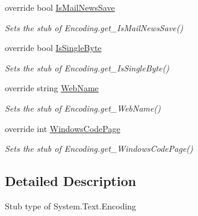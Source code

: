 \begin{DoxyCompactItemize}
override bool \hyperlink{class_system_1_1_text_1_1_fakes_1_1_stub_encoding_accb4e359b9ed466bb199413dc0393934}{Is\-Mail\-News\-Save}
\begin{DoxyCompactList}\small\item\em Sets the stub of Encoding.\-get\-\_\-\-Is\-Mail\-News\-Save()\end{DoxyCompactList}\item 
override bool \hyperlink{class_system_1_1_text_1_1_fakes_1_1_stub_encoding_adee6cc70909c3c18fd26ea3bbe9387b1}{Is\-Single\-Byte}
\begin{DoxyCompactList}\small\item\em Sets the stub of Encoding.\-get\-\_\-\-Is\-Single\-Byte()\end{DoxyCompactList}\item 
override string \hyperlink{class_system_1_1_text_1_1_fakes_1_1_stub_encoding_af3773749cb2996fdf4b648b1b5650fb5}{Web\-Name}
\begin{DoxyCompactList}\small\item\em Sets the stub of Encoding.\-get\-\_\-\-Web\-Name()\end{DoxyCompactList}\item 
override int \hyperlink{class_system_1_1_text_1_1_fakes_1_1_stub_encoding_ab99fe3593a8ce57d23a5cf7293b21225}{Windows\-Code\-Page}
\begin{DoxyCompactList}\small\item\em Sets the stub of Encoding.\-get\-\_\-\-Windows\-Code\-Page()\end{DoxyCompactList}\end{DoxyCompactItemize}


\subsection{Detailed Description}
Stub type of System.\-Text.\-Encoding



